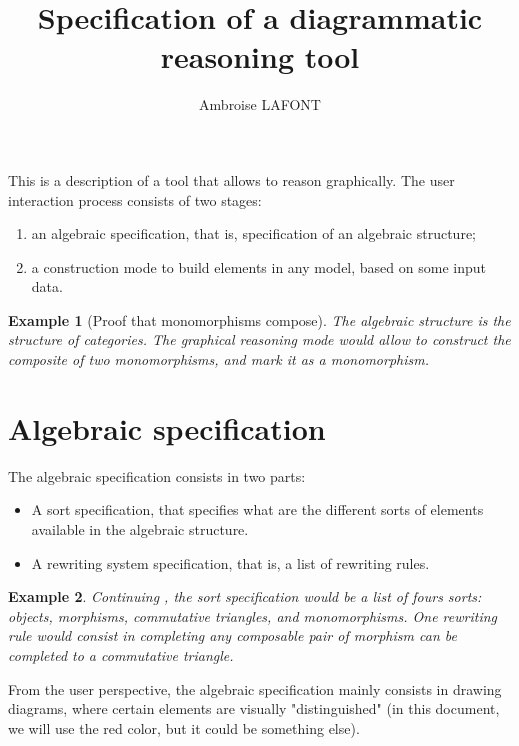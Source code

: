 \documentclass{article}
\title{Specification of a diagrammatic reasoning tool}
\author{Ambroise LAFONT}
\newtheorem{example}{Example}[section]
\begin{document}
\maketitle{}
This is a description of a tool that allows to reason graphically. 
The user interaction process consists of two stages:
\begin{enumerate}
    \item an algebraic specification, that is, specification of an algebraic structure;
    \item a construction mode 
    to build elements in any model, based on some input data.
    \end{enumerate}
    \begin{example}[Proof that monomorphisms compose]
        \label{ex:proof-mono}
        The algebraic structure is the structure of categories.
        The graphical reasoning mode would allow to construct the composite of two monomorphisms, and mark it as a monomorphism.
    \end{example}
    \tableofcontents
\section{Algebraic specification}
The algebraic specification consists in two parts:
\begin{itemize}
    \item A sort specification, that specifies what are the different sorts of elements available in the algebraic structure.
    \item A rewriting system specification, that is, a list of rewriting rules.
\end{itemize}

\begin{example}
    \label{ex:proof-mono-alg-spec}
    Continuing , the sort specification would be a list of fours sorts: objects, morphisms, commutative triangles, and monomorphisms.
One rewriting rule would consist in completing 
any composable pair of morphism can be completed to a commutative triangle.
\end{example}

From the user perspective, the algebraic specification mainly consists in drawing diagrams, where certain elements are visually "distinguished" (in this document, we will use the red color, but it could be something else).
\end{document}
